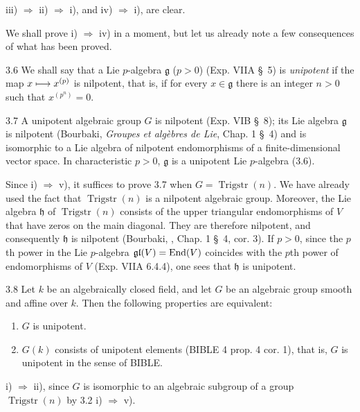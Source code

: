 \noindent iii) $\Rightarrow$ ii) $\Rightarrow$ i), and iv) $\Rightarrow$ i), are clear.

We shall prove i) $\Rightarrow$ iv) in a moment, but let us already note a few consequences of what has been proved.

\begin{definition}{3.6}\label{XVII.3.6}
We shall say that a Lie $p$-algebra $\mathfrak g$ ($p>0$) (\cf Exp. VIIA \S~5) is \emph{unipotent} if the map $x\longmapsto x^{(p)}$ is nilpotent, that is, if for every $x\in\mathfrak g$ there is an integer $n>0$ such that $x^{(p^n)}=0$.
\end{definition}

\begin{corollary}{3.7}\label{XVII.3.7}
A unipotent algebraic group $G$ is nilpotent (Exp. VIB \S~8); its Lie algebra $\mathfrak g$ is nilpotent (Bourbaki, \emph{Groupes et algèbres de Lie}, Chap. 1 \S~4) and is isomorphic to a Lie algebra of nilpotent endomorphisms of a finite-dimensional vector space. In characteristic $p>0$, $\mathfrak g$ is a unipotent Lie $p$-algebra (3.6).
\end{corollary}
Since i) $\Rightarrow$ v), it suffices to prove 3.7 when $G=\operatorname{Trigstr}(n)$. We have already used the fact that $\operatorname{Trigstr}(n)$ is a nilpotent algebraic group. Moreover, the Lie algebra $\mathfrak h$ of $\operatorname{Trigstr}(n)$ consists of the upper triangular endomorphisms of $V$ that have zeros on the main diagonal. They are therefore nilpotent, and consequently $\mathfrak h$ is nilpotent (Bourbaki, \loccit, Chap. 1 \S~4, cor. 3). If $p>0$, since the $p$th power in the Lie $p$-algebra $\mathfrak{gl}(V)=\operatorname{End}(V)$ coincides with the $p$th power of endomorphisms of $V$ (Exp. VIIA 6.4.4), one sees that $\mathfrak h$ is unipotent.

\begin{corollary}{3.8}\label{XVII.3.8}
Let $k$ be an algebraically closed field, and let $G$ be an algebraic group smooth and affine over $k$. Then the following properties are equivalent:
\begin{enumerate}[label=\textup{\roman*)}]
\item $G$ is unipotent.
\item $G(k)$ consists of unipotent elements (BIBLE 4 prop. 4 cor. 1), that is, $G$ is unipotent in the sense of BIBLE.
\end{enumerate}
\end{corollary}
\noindent i) $\Rightarrow$ ii), since $G$ is isomorphic to an algebraic subgroup of a group $\operatorname{Trigstr}(n)$ by 3.2 i) $\Rightarrow$ v).

